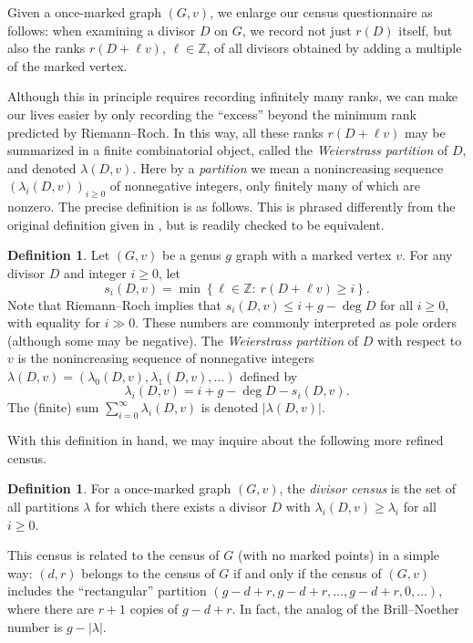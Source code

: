\documentclass[11pt]{article}
\theoremstyle{definition}
\newtheorem{defi}[theo]{Definition}
\numberwithin{equation}{section}
\newcommand{\Z}{\mathbb{Z}}
\begin{document}
Given a once-marked graph $(G,v)$, we enlarge our census questionnaire as follows: when examining a divisor $D$ on $G$, we record not just $r(D)$ itself, but also the ranks $r(D+\ell v)$, $\ell \in \Z$, of all divisors obtained by adding a multiple of the marked vertex.

Although this in principle requires recording infinitely many ranks, we can make our lives easier by only recording the ``excess'' beyond the minimum rank predicted by Riemann--Roch. In this way, all these ranks $r(D + \ell v)$ may be summarized in a finite combinatorial object, called the \emph{Weierstrass partition} of $D$, and denoted $\lambda(D,v)$. Here by a \emph{partition} we mean a nonincreasing sequence $(\lambda_i(D,v))_{i \geq 0}$ of nonnegative integers, only finitely many of which are nonzero. The precise definition is as follows. This is phrased differently from the original definition given in \cite{Pfl17}, but is readily checked to be equivalent.

\begin{defi}
Let $(G,v)$ be a genus $g$ graph with a marked vertex $v$. For any divisor $D$ and integer $i \geq 0$, let
$$s_i(D,v) = \operatorname{min} \left\{ \ell \in \Z:\ r(D+\ell v) \geq i \right\}.$$
Note that Riemann--Roch implies that $s_i(D,v) \leq i + g - \deg D$ for all $i \geq 0$, with equality for $i \gg 0$.
These numbers are commonly interpreted as pole orders (although some may be negative).
The \emph{Weierstrass partition} of $D$ with respect to $v$ is the nonincreasing sequence of nonnegative integers 
$\lambda(D,v) = (\lambda_0(D,v), \lambda_1(D,v), \ldots)$
defined by $$\lambda_i(D,v) = i  + g - \deg D- s_i(D,v).$$
The (finite) sum $\displaystyle \sum_{i=0}^\infty \lambda_i(D,v)$ is denoted $| \lambda(D,v) |$.
\end{defi}

With this definition in hand, we may inquire about the following more refined census.

\begin{defi}
For a once-marked graph $(G,v)$, the \emph{divisor census} is the set of all partitions $\lambda$ for which there exists a divisor $D$ with $\lambda_i(D,v) \geq \lambda_i$ for all $i \geq 0$.
\end{defi}

This census is related to the census of $G$ (with no marked points) in a simple way: $(d,r)$ belongs to the census of $G$ if and only if the census of $(G,v)$ includes the ``rectangular'' partition $(g-d+r,g-d+r,\ldots,g-d+r,0,\ldots)$, where there are $r+1$ copies of $g-d+r$. In fact, the analog of the Brill--Noether number is $g - |\lambda|$.
\end{document}
